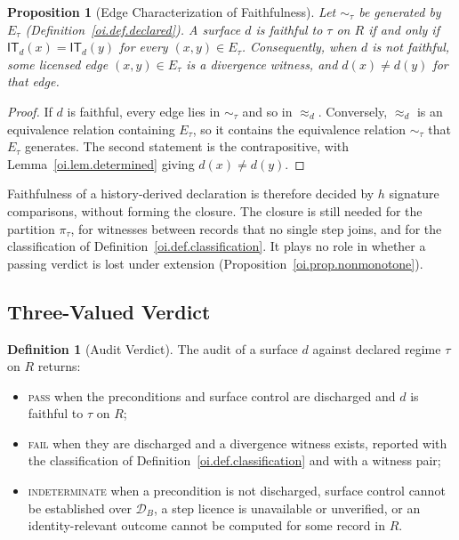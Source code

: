\documentclass[11pt]{article}
\theoremstyle{plain}
\newtheorem{proposition}[theorem]{Proposition}
\theoremstyle{definition}
\newtheorem{definition}[theorem]{Definition}
\theoremstyle{remark}
\newcommand{\IT}{\ensuremath{\mathsf{IT}}}
\newcommand{\Ker}{\ensuremath{\mathrel{\approx_{d}}}}
\newcommand{\PASS}{\textnormal{\textsc{pass}}}
\newcommand{\FAIL}{\textnormal{\textsc{fail}}}
\newcommand{\INDET}{\textnormal{\textsc{indeterminate}}}
\begin{document}
\begin{proposition}[Edge Characterization of Faithfulness]
  \label{oi.prop.edges}
  Let \(\sim_{\tau}\) be generated by \(E_{\tau}\)
  (Definition~\ref{oi.def.declared}).
  A surface \(d\) is faithful to \(\tau\) on \(R\)
  if and only if \(\IT_d(x)=\IT_d(y)\) for every \((x,y)\in E_{\tau}\).
  Consequently, when \(d\) is not faithful,
  some licensed edge \((x,y)\in E_{\tau}\) is a divergence witness,
  and \(d(x)\neq d(y)\) for that edge.
\end{proposition}

\begin{proof}
  If \(d\) is faithful, every edge lies in \(\sim_{\tau}\) and so in \(\Ker\).
  Conversely, \(\Ker\) is an equivalence relation containing \(E_{\tau}\),
  so it contains the equivalence relation \(\sim_{\tau}\) that \(E_{\tau}\) generates.
  The second statement is the contrapositive,
  with Lemma~\ref{oi.lem.determined} giving \(d(x)\neq d(y)\).
\end{proof}

Faithfulness of a history-derived declaration is therefore decided
by \(h\) signature comparisons, without forming the closure.
The closure is still needed for the partition \(\pi_{\tau}\),
for witnesses between records that no single step joins,
and for the classification of Definition~\ref{oi.def.classification}.
It plays no role in whether a passing verdict is lost under extension
(Proposition~\ref{oi.prop.nonmonotone}).

\subsection{Three-Valued Verdict}

\begin{definition}[Audit Verdict]
  \label{oi.def.verdict}
  The audit of a surface \(d\) against declared regime \(\tau\) on \(R\) returns:
  \begin{itemize}
    \item \PASS{} when the preconditions and surface control are discharged
          and \(d\) is faithful to \(\tau\) on \(R\);
    \item \FAIL{} when they are discharged and a divergence witness exists,
          reported with the classification of
          Definition~\ref{oi.def.classification}
          and with a witness pair;
    \item \INDET{} when a precondition is not discharged,
          surface control cannot be established over \(\mathcal{D}_B\),
          a step licence is unavailable or unverified,
          or an identity-relevant outcome cannot be computed
          for some record in \(R\).
  \end{itemize}
\end{definition}
\end{document}
